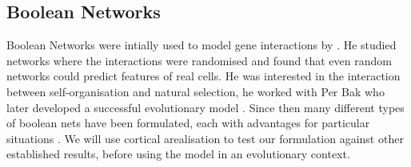 \documentclass[a4paper,11pt]{article}
\begin{document}
\subsection{Boolean Networks}

Boolean Networks were intially used to model gene interactions by \cite{Kauffman1969}. He studied networks where the interactions were randomised and found that even random networks could predict features of real cells. He was interested in the interaction between self-organisation and natural selection, he worked with Per Bak who later developed a successful evolutionary model \citep{Bak1993}. Since then many different types of boolean nets have been formulated, each with advantages for particular situations \citep{Bornholdt2008}. We will use cortical arealisation to test our formulation against other established results, before using the model in an evolutionary context.\par
\end{document}
